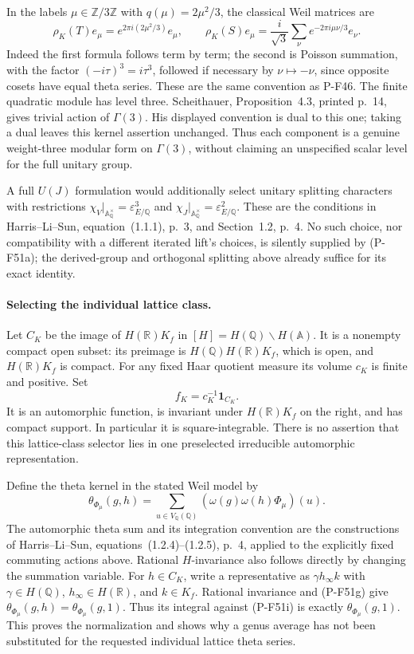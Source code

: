 In the labels $\mu\in\mathbb Z/3\mathbb Z$ with
$q(\mu)=2\mu^2/3$, the classical Weil matrices are
\[
 \rho_K(T)e_\mu=e^{2\pi i(2\mu^2/3)}e_\mu,
 \qquad
 \rho_K(S)e_\mu=\frac{i}{\sqrt3}
                  \sum_\nu e^{-2\pi i\mu\nu/3}e_\nu.
 \tag{P-F51h}
\]
Indeed the first formula follows term by term; the
second is Poisson summation, with the factor
$(-i\tau)^3=i\tau^3$, followed if necessary by
$\nu\mapsto-\nu$, since opposite cosets have equal
theta series. These are the same convention as P-F46.
The finite quadratic module has level three.
Scheithauer, Proposition~4.3, printed p.~14, gives
trivial action of $\Gamma(3)$. His displayed convention
is dual to this one; taking a dual leaves this kernel
assertion unchanged. Thus each component is a genuine
weight-three modular form on $\Gamma(3)$, without
claiming an unspecified scalar level for the full
unitary group.

A full $U(J)$ formulation would additionally select
unitary splitting characters with restrictions
$\chi_V|_{\mathbb A_\mathbb Q^\times}=\varepsilon_{E/\mathbb Q}^3$
and $\chi_J|_{\mathbb A_\mathbb Q^\times}=\varepsilon_{E/\mathbb Q}^2$.
These are the conditions in Harris--Li--Sun,
equation~(1.1.1), p.~3, and Section~1.2, p.~4.
No such choice, nor compatibility with a different
iterated lift's choices, is silently supplied by
(P-F51a); the derived-group and orthogonal splitting
above already suffice for its exact identity.

\paragraph{Selecting the individual lattice class.}
Let $C_K$ be the image of
$H(\mathbb R)K_f$ in $[H]=H(\mathbb Q)\backslash H(\mathbb A)$.
It is a nonempty compact open subset: its preimage is
$H(\mathbb Q)H(\mathbb R)K_f$, which is open, and
$H(\mathbb R)K_f$ is compact. For any fixed Haar
quotient measure its volume $c_K$ is finite and positive.
Set
\[
                   f_K=c_K^{-1}\mathbf1_{C_K}.
 \tag{P-F51i}
\]
It is an automorphic function, is invariant under
$H(\mathbb R)K_f$ on the right, and has compact support.
In particular it is square-integrable. There is no
assertion that this lattice-class selector lies in
one preselected irreducible automorphic representation.

Define the theta kernel in the stated Weil model by
\[
 \theta_{\Phi_\mu}(g,h)=
       \sum_{u\in V_{\mathbb Q}(\mathbb Q)}
                         (\omega(g)\omega(h)\Phi_\mu)(u).
 \tag{P-F51j}
\]
The automorphic theta sum and its integration convention
are the constructions of Harris--Li--Sun,
equations~(1.2.4)--(1.2.5), p.~4, applied to the
explicitly fixed commuting actions above.
Rational $H$-invariance also follows
directly by changing the summation variable.
For $h\in C_K$, write a representative as
$\gamma h_\infty k$ with $\gamma\in H(\mathbb Q)$,
$h_\infty\in H(\mathbb R)$, and $k\in K_f$.
Rational invariance and (P-F51g) give
$\theta_{\Phi_\mu}(g,h)=\theta_{\Phi_\mu}(g,1)$.
Thus its integral against (P-F51i) is exactly
$\theta_{\Phi_\mu}(g,1)$. This proves the normalization
and shows why a genus average has not been substituted
for the requested individual lattice theta series.

